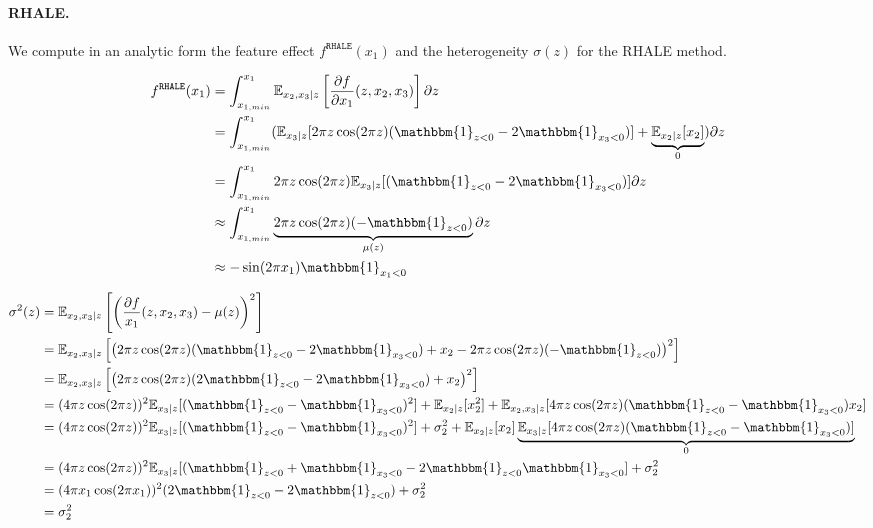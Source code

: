 \documentclass{article} %
\begin{document}
\paragraph{RHALE.} We compute in an analytic form the feature effect $f^{\mathtt{RHALE}}(x_1)$ and the
heterogeneity $\sigma(z)$ for the RHALE method.

\begin{align}
  f^{\mathtt{RHALE}}(x_1) &=
     \int_{x_{1,min}}^{x_1} \mathbb{E}_{x_2, x_3|z} \left [ \frac{\partial f}{\partial x_1}(z, x_2, x_3) \right ] \partial z\\
  &= \int_{x_{1,min}}^{x_1} ( \mathbb{E}_{x_3|z} [ 2 \pi z \cos(2 \pi z)  (\mathbbm{1}_{z < 0} - 2\mathbbm{1}_{x_3 < 0}) ] + \underbrace{\mathbb{E}_{x_2|z} [x_2]}_{0} ) \partial z\\
  &= \int_{x_{1,min}}^{x_1} 2 \pi z \cos(2 \pi z) \mathbb{E}_{x_3|z} [(\mathbbm{1}_{z < 0} - 2\mathbbm{1}_{x_3 < 0}) ] \partial z \\
  &\approx \int_{x_{1,min}}^{x_1} \underbrace{2 \pi z \cos(2 \pi z) (-\mathbbm{1}_{z < 0})}_{\mu(z)} \partial z \\
  &\approx  - \sin(2 \pi x_1) \mathbbm{1}_{x_1 < 0}
\end{align}

\begin{align}
  \sigma^2(z) &= \mathbb{E}_{x_2, x_3|z}\left [ \left (\frac{\partial f}{x_1} (z, x_2, x_3) - \mu(z) \right )^2 \right ]\\
  &= \mathbb{E}_{x_2, x_3|z} \left [ \left (2 \pi z \cos(2 \pi z)  (\mathbbm{1}_{z < 0} - 2\mathbbm{1}_{x_3 < 0}) + x_2 - 2 \pi z \cos(2 \pi z) (-\mathbbm{1}_{z < 0}) \right )^2 \right ] \\
  &= \mathbb{E}_{x_2, x_3|z} \left [ \left (2 \pi z \cos(2 \pi z)  (2 \mathbbm{1}_{z < 0} - 2\mathbbm{1}_{x_3 < 0}) + x_2 \right )^2 \right ] \\
  &= (4 \pi z \cos(2 \pi z))^2 \mathbb{E}_{x_3|z} [ (\mathbbm{1}_{z < 0} - \mathbbm{1}_{x_3 < 0})^2 ] + \mathbb{E}_{x_2|z} [x_2^2] + \mathbb{E}_{x_2, x_3|z} [4 \pi z \cos(2 \pi z) (\mathbbm{1}_{z < 0} - \mathbbm{1}_{x_3 < 0}) x_2]\\
  &= (4 \pi z \cos(2 \pi z))^2 \mathbb{E}_{x_3|z} [ (\mathbbm{1}_{z < 0} - \mathbbm{1}_{x_3 < 0})^2 ] + \sigma_2^2 + \mathbb{E}_{x_2|z}[x_2] \underbrace{\mathbb{E}_{x_3|z} [4 \pi z \cos(2 \pi z) (\mathbbm{1}_{z < 0} - \mathbbm{1}_{x_3 < 0})]}_{0}\\
  &= (4 \pi z \cos(2 \pi z))^2 \mathbb{E}_{x_3|z} [ (\mathbbm{1}_{z < 0} + \mathbbm{1}_{x_3 < 0} - 2\mathbbm{1}_{z < 0} \mathbbm{1}_{x_3 < 0} ] + \sigma_2^2 \\
  &= (4 \pi x_1 \cos(2 \pi x_1))^2 (2 \mathbbm{1}_{z < 0} - 2\mathbbm{1}_{z < 0}) + \sigma_2^2 \\
    &= \sigma_2^2
\end{align}
\end{document}
